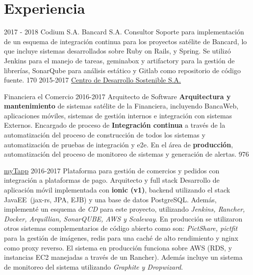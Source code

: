 \documentclass[]{friggeri-cv}
\begin{document}
\section{Experiencia}
\begin{entrylist}
\entry
    {2017 - 2018}
    {Codium S.A.}
    {}
    { \proyecto
        {Bancard S.A.}
        {}
        {}
        {Consultor}
        {Soporte para implementación de un esquema de integración continua para los proyectos satélite
    de Bancard, lo que incluye sistemas desarrollados sobre Ruby on Rails, y Spring.  Se utilizó Jenkins 
    para el manejo de tareas, geminabox y artifactory para la gestión de librerías,
    SonarQube para análisis estático y Gitlab como repositorio de código fuente.} 
        {170}
    }
    {}
\entry
    {2015-2017}
    {\href{http://www.cds.com.py}{Centro de Desarrollo Sostenible S.A.}}
    {}
    {\proyecto
        {Financiera el Comercio}
        {2016-2017}
        {}
        {Arquitecto de Software}
        {
        \textbf{Arquitectura y mantenimiento} de sistemas satélite de la Financiera, incluyendo BancaWeb, aplicaciones móviles, sistemas de gestión internos e integración con sistemas Externos. Encargado de proceso de 
        \textbf{Integración continua} a través de la automatización del proceso de construcción de todos los sistemas y automatización de pruebas de integración y e2e. En el área de \textbf{producción}, automatización del proceso de monitoreo de sistemas y generación de alertas.
        } 
        {976}
    
    \proyecto
        {\href{https://www.mytappweb.com}{myTapp}}
        {2016-2017}
        {Plataforma para gestión de comercios y pedidos con integración a plataformas de pago.}
        {Arquitecto y full stack}
        {
        Desarrollo de aplicación móvil implementada con  \textbf{ionic (v1)}, 
        backend utilizando el stack JavaEE~(jax-rs, JPA, EJB) y una base de datos
        PostgreSQL.  Además, implementé un esquema de \textit{CD} para este proyecto,
        utilizando \textit{Jenkins, Rancher, Docker, Arquillian, SonarQUBE, AWS y Scaleway}.  
        En producción se utilizaron  otros sistemas complementarios de código abierto 
        como son: \textit{PictShare, pictfit} para la gestión de imágenes, redis para una
        caché de alto rendimiento y nginx como proxy reverso.  El sistema en producción 
        funciona sobre AWS (RDS, y instancias EC2 manejadas a 
        través de un Rancher). Además incluye un sistema de monitoreo del sistema
        utilizando \textit{Graphite y Dropwizard}.
        } 
        {}
        
}
\end{entrylist}
\end{document}
